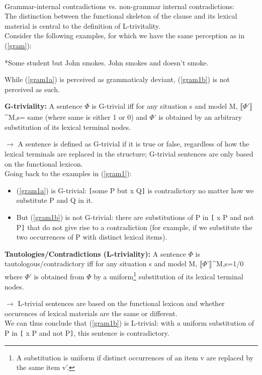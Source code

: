 \documentclass[a4paper,11pt]{article}
\newcommand{\eval}[2][]{$\llbracket$#2$\rrbracket_{#1}$}
\begin{document}
 \paragraph{}
 Grammar-internal contradictions vs. non-grammar internal contradictions:
 \\The distinction between the functional skeleton of the clause and its lexical material is central to the definition of L-trivitality.
 \\Consider the following examples, for which we have the same perception as in (\ref{gram}):
 \begin{exe}
 \ex\label{gram1} \begin{xlist}
 \ex\label{gram1a} *Some student but John smokes.
 \ex\label{gram1b} John smokes and doesn't smoke.
 \end{xlist}
 \end{exe}
 While (\ref{gram1a}) is perceived as grammaticaly deviant, (\ref{gram1b}) is not perceived as such.
 \begin{exe}
 \ex\label{gtri} \textbf{G-triviality:} A  sentence $\Phi$ is G-trivial iff for any situation s and model M, \eval{$\Phi$'}^{M,s}= same (where same is either 1 or 0) and $\Phi$' is obtained by an arbitrary substitution of its lexical terminal nodes.
 \end{exe}
 $\rightarrow$ A sentence is defined as G-trivial if it is true or false, regardless of how the lexical terminals are replaced in the structure; G-trivial sentences are only based on the functional lexicon.
 \\Going back to the examples in (\ref{gram1}):
 \begin{itemize}
 \item (\ref{gram1a}) is G-trivial: \verb![!some P but x Q\verb!]! is contradictory no matter how we substitute P and Q in it.
 \item But (\ref{gram1b}) is not G-trivial: there are substitutions of P in \verb![! x P and not P\verb!]! that do not give rise to a contradiction (for example, if we substitute the two occurrences of P with distinct lexical items).
 \end{itemize}
 \begin{exe}
 \ex\label{taut} \textbf{Tautologies/Contradictions (L-triviality):} A sentence $\Phi$ is tautologous/contradictory iff for any situation s and model M, \eval{$\Phi$'}^{M,s}=1/0 where $\Phi$' is obtained from $\Phi$ by a uniform\footnote{A substitution is uniform if distinct occurrences of an item v are replaced by the same item v'.} substitution of its lexical terminal nodes.
 \end{exe}
 $\rightarrow$ L-trivial sentences are based on the functional lexicon and whether occurences of lexical materials are the same or different.
 \\We can thus conclude that (\ref{gram1b}) is L-trivial: with a uniform substitution of P in \verb![! x P and not P\verb!]!, this sentence is contradictory.
\end{document}
